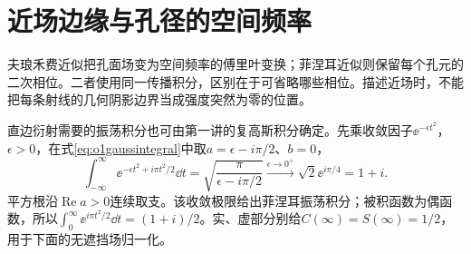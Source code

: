 \section{近场边缘与孔径的空间频率}
夫琅禾费近似把孔面场变为空间频率的傅里叶变换；菲涅耳近似则保留每个孔元的二次相位。二者使用同一传播积分，区别在于可省略哪些相位。描述近场时，不能把每条射线的几何阴影边界当成强度突然为零的位置。

直边衍射需要的振荡积分也可由第一讲的复高斯积分确定。先乘收敛因子$\ee^{-\epsilon t^2}$，$\epsilon>0$，在式\eqref{eq:o1gaussintegral}中取$a=\epsilon-i\pi/2$、$b=0$，
\[
 \int_{-\infty}^{\infty}\ee^{-\epsilon t^2+i\pi t^2/2}\dd t
 =\sqrt{\frac{\pi}{\epsilon-i\pi/2}}
 \xrightarrow{\epsilon\to0^+}\sqrt2\ee^{i\pi/4}=1+i.
\]
平方根沿$\operatorname{Re}a>0$连续取支。该收敛极限给出菲涅耳振荡积分；被积函数为偶函数，所以$\int_0^\infty\ee^{i\pi t^2/2}\dd t=(1+i)/2$。实、虚部分别给$C(\infty)=S(\infty)=1/2$，用于下面的无遮挡场归一化。

